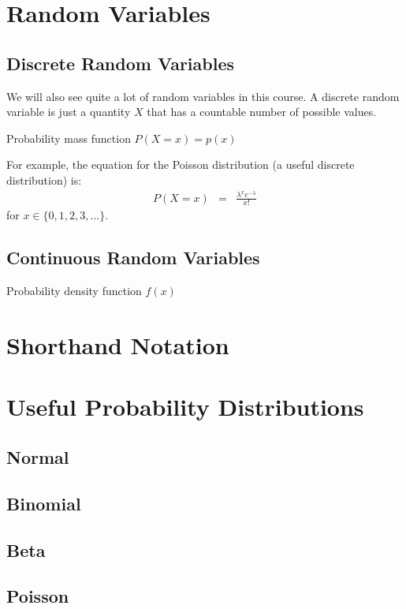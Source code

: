 \section{Random Variables}

\subsection{Discrete Random Variables}
We will also see quite a lot of random variables in this course. A discrete
random variable is just a quantity $X$ that has a countable number of possible
values.

Probability mass function
$P(X=x) = p(x)$

For example, the equation for the Poisson distribution (a useful discrete
distribution) is:
\begin{eqnarray}
P(X=x) &=& \frac{\lambda^x e^{-\lambda}}{x!}
\end{eqnarray}
for $x \in \{0, 1, 2, 3, ...\}$.

\subsection{Continuous Random Variables}
Probability density function
$f(x)$


\section{Shorthand Notation}



\section{Useful Probability Distributions}

\subsection{Normal}


\subsection{Binomial}


\subsection{Beta}


\subsection{Poisson}


